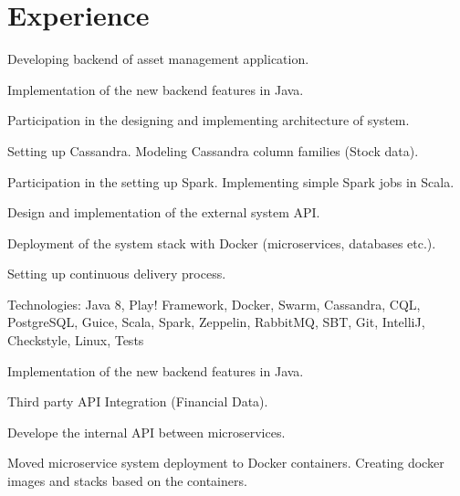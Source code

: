 \documentclass[]{deedy-resume-openfont}
\begin{document}
\begin{minipage}[t]{0.66\textwidth} 


\section{Experience}

Developing backend of asset management application. %
\vspace{\topsep} %
\begin{tightemize}
\item Implementation of the new backend features in Java.
\item Participation in the designing and implementing architecture of system. 
\item Setting up Cassandra. Modeling Cassandra column families (Stock data).
\item Participation in the setting up Spark. Implementing simple Spark jobs in Scala. 
\item Design and implementation of the external system API.
\item Deployment of the system stack with Docker (microservices, databases etc.).
\item Setting up continuous delivery process.
\end{tightemize}
Technologies: Java 8, Play! Framework, Docker, Swarm, Cassandra, CQL, PostgreSQL, Guice, Scala, Spark, Zeppelin, RabbitMQ, SBT, Git, IntelliJ, Checkstyle, Linux, Tests
\sectionsep

\begin{tightemize}
\item Implementation of the new backend features in Java.
\item Third party API Integration (Financial Data).
\item Develope the internal API between microservices.
\item Moved microservice system deployment to Docker containers. Creating docker images and stacks based on the containers.
\end{tightemize}
\sectionsep


\end{minipage}
\end{document}
